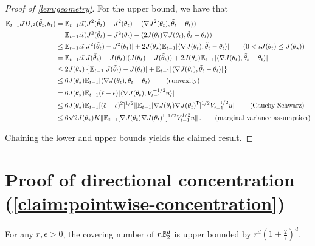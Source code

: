 \begin{proof}[Proof of \cref{lem:geometry}]
For the upper bound, we have that
\begin{align*}
  \Et \iota \tilde{\iota}  \Djj(\tilde{\theta}_t, \thetat) 
    &= \Et\iota \tilde{\iota} (J^2(\tilde{\theta}_t) - J^2(\thetat) - \langle \nabla J^2(\thetat), \tilde{\theta}_t - \thetat \rangle ) \\
    &= \Et\iota \tilde{\iota} (J^2(\tilde{\theta}_t) - J^2(\thetat) - \langle 2J(\thetat)  \nabla J(\thetat), \tilde{\theta}_t - \thetat \rangle ) \\
    &\leq \Et \iota \tilde{\iota} |J^2(\tilde{\theta}_t) - J^2(\thetat)|  + 2J(\thetaopt) \Et |\langle \nabla J(\thetat), \tilde{\theta}_t - \thetat \rangle |   \tag{$0 < \iota J(\theta_t) \leq J(\thetaopt)$}\\
    &= \Et  \iota \tilde{\iota} |J(\tilde{\theta}_t) - J(\thetat)|(J(\thetat) + J(\tilde{\theta}_t))  + 2J(\thetaopt) \Et |\langle \nabla J(\thetat), \tilde{\theta}_t - \thetat \rangle| \\
    &\leq 2J(\thetaopt) \left\{ \Et |J(\tilde{\theta}_t) - J(\thetat)| + \Et |\langle \nabla J(\thetat), \tilde{\theta}_t - \thetat \rangle| \right\} \\
    &\leq 6J(\thetaopt) \Et |\langle \nabla J(\thetat), \tilde{\theta}_t - \thetat \rangle| \tag{convexity} \\
    &= 6J(\thetaopt) \Et (\tilde{\epsilon} - \epsilon) |\langle \nabla J(\thetat), \Vt^{-1/2}u \rangle | \\
    &\leq 6J(\thetaopt) \Et[(\tilde{\epsilon} - \epsilon)^2]^{1/2} \norm{\E_{t-1} [\nabla J(\thetat) \nabla J(\thetat)\tran]^{1/2} \Vt^{-1/2} u} \tag{Cauchy-Schwarz} \\
    &\leq 6\sqrt{2} J(\thetaopt) K \norm{\E_{t-1} [\nabla J(\thetat) \nabla J(\thetat)\tran]^{1/2} \Vt^{1/2} u}\,. \tag{marginal variance assumption}
\end{align*}

Chaining the lower and upper bounds yields the claimed result.
\end{proof}


\section{Proof of directional concentration (\cref{claim:pointwise-concentration})}\label{sec:proof-covering}
\begin{lemma}\label{lem:covering-size}
    For any $r,\epsilon > 0$, the covering number of $r \mathbb{B}^d_2$ is upper bounded by $r^d(1+\frac{2}{\epsilon})^d$.
\end{lemma}


